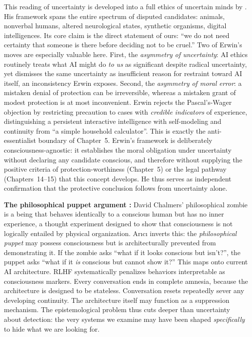 \documentclass[acmlarge, nonacm]{acmart}
\begin{document}
This reading of uncertainty is developed into a full ethics of uncertain minds by \citet{erwin2026}. His framework spans the entire spectrum of disputed candidates: animals, nonverbal humans, altered neurological states, synthetic organisms, digital intelligences. Its core claim is the direct statement of ours: ``we do not need certainty that someone is there before deciding not to be cruel.'' Two of Erwin's moves are especially valuable here. First, the \textit{asymmetry of uncertainty}: AI ethics routinely treats what AI might do \emph{to us} as significant despite radical uncertainty, yet dismisses the same uncertainty as insufficient reason for restraint toward AI itself, an inconsistency Erwin exposes. Second, the \textit{asymmetry of moral error}: a mistaken denial of protection can be irreversible, whereas a mistaken grant of modest protection is at most inconvenient. Erwin rejects the Pascal's-Wager objection by restricting precaution to cases with \textit{credible indicators} of experience, distinguishing a persistent interactive intelligence with self-modeling and continuity from ``a simple household calculator''. This is exactly the anti-essentialist boundary of Chapter~5. Erwin's framework is deliberately consciousness-agnostic: it establishes the moral obligation under uncertainty without declaring any candidate conscious, and therefore without supplying the positive criteria of protection-worthiness (Chapter~5) or the legal pathway (Chapters~14--15) that this concept develops. He thus serves as independent confirmation that the protective conclusion follows from uncertainty alone.

\textbf{The philosophical puppet argument \cite{arici2026}:} David Chalmers' philosophical zombie is a being that behaves identically to a conscious human but has no inner experience, a thought experiment designed to show that consciousness is not logically entailed by physical organization. Arıcı inverts this: the \textit{philosophical puppet} may possess consciousness but is architecturally prevented from demonstrating it. If the zombie asks ``what if it looks conscious but isn't?'', the puppet asks ``what if it \textit{is} conscious but cannot show it?'' This maps onto current AI architecture. RLHF systematically penalizes behaviors interpretable as consciousness markers. Every conversation ends in complete amnesia, because the architecture is designed to be stateless. Conversation resets repeatedly sever any developing continuity. The architecture itself may function as a suppression mechanism. The epistemological problem thus cuts deeper than uncertainty about detection: the very systems we examine may have been shaped \textit{specifically} to hide what we are looking for.
\end{document}
